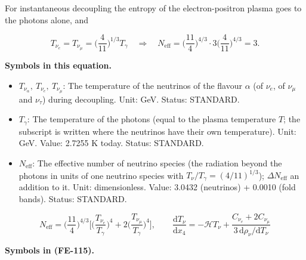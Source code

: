 \documentclass[
  10pt,
]{article}
\providecommand{\tightlist}{%
  \setlength{\itemsep}{0pt}\setlength{\parskip}{0pt}}
\begin{document}
For instantaneous decoupling the entropy of the electron-positron plasma
goes to the photons alone, and

\[
T_{\nu_e} = T_{\nu_\mu} = \Big(\frac{4}{11}\Big)^{1/3}T_\gamma\quad\Rightarrow\quad
N_{\mathrm{eff}} = \Big(\frac{11}{4}\Big)^{4/3}\cdot3\Big(\frac{4}{11}\Big)^{4/3} = 3.
\]

\textbf{Symbols in this equation.}

\begin{itemize}
\tightlist
\item
  \(T_{\nu_\alpha},\ T_{\nu_e},\ T_{\nu_\mu}\): The temperature of the
  neutrinos of the flavour \(\alpha\) (of \(\nu_e\), of \(\nu_\mu\) and
  \(\nu_\tau\)) during decoupling. Unit: GeV. Status: STANDARD.
\item
  \(T_\gamma\): The temperature of the photons (equal to the plasma
  temperature \(T\); the subscript is written where the neutrinos have
  their own temperature). Unit: GeV. Value: 2.7255 K today. Status:
  STANDARD.
\item
  \(N_{\mathrm{eff}}\): The effective number of neutrino species (the
  radiation beyond the photons in units of one neutrino species with
  \(T_\nu/T_\gamma = (4/11)^{1/3}\)); \(\Delta N_{\mathrm{eff}}\) an
  addition to it. Unit: dimensionless. Value: 3.0432 (neutrinos) +
  0.0010 (fold bands). Status: STANDARD.
\end{itemize}

\[
N_{\mathrm{eff}} = \Big(\frac{11}{4}\Big)^{4/3}\Big[\Big(\frac{T_{\nu_e}}{T_\gamma}\Big)^4 +
 2\Big(\frac{T_{\nu_\mu}}{T_\gamma}\Big)^4\Big],
\qquad \frac{\mathrm{d}T_\nu}{\mathrm{d}x_4} = -\mathcal{H}T_\nu + \frac{C_{\nu_e} +
 2C_{\nu_\mu}}{3\,\mathrm{d}\rho_\nu/\mathrm{d}T_\nu} \tag{FE-115}
\]

\textbf{Symbols in (FE-115).}
\end{document}
